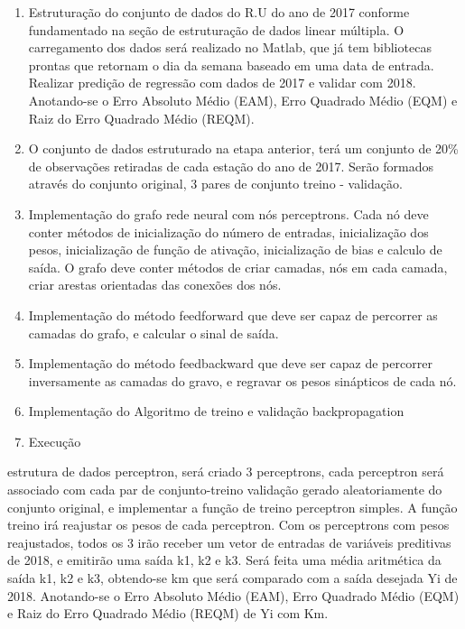 \documentclass[	12pt, Times, openright, twoside, a4paper, english, brazil]{abntex2}
\begin{document}
    \begin{enumerate}
    
    \item Estruturação do conjunto de dados do R.U do ano de 2017 conforme fundamentado na seção de estruturação de dados linear múltipla. O carregamento dos dados será realizado no Matlab, que já tem bibliotecas prontas que retornam o dia da semana baseado em uma data de entrada. Realizar predição de regressão com dados de 2017 e validar com 2018. Anotando-se o Erro Absoluto Médio (EAM), Erro Quadrado Médio (EQM) e Raiz do Erro Quadrado Médio (REQM).
    
    \item O conjunto de dados estruturado na etapa anterior, terá um conjunto de 20\% de observações retiradas de cada estação do ano de 2017. Serão formados através do conjunto original, 3 pares de conjunto treino - validação.
    
    \item Implementação do grafo rede neural com nós perceptrons. Cada nó deve conter métodos de inicialização do número de entradas, inicialização dos pesos, inicialização de função de ativação, inicialização de bias e calculo de saída. O grafo deve conter métodos de criar camadas, nós em cada camada, criar arestas orientadas das conexões dos nós.

    \item Implementação do método feedforward que deve ser capaz de percorrer as camadas do grafo, e calcular o sinal de saída.

    \item Implementação do método feedbackward que deve ser capaz de percorrer inversamente as camadas do gravo, e regravar os pesos sinápticos de cada nó.

    \item Implementação do Algoritmo de treino e validação backpropagation

    \item Execução 

    \end{enumerate}

     estrutura de dados perceptron, será criado 3 perceptrons, cada perceptron será associado com cada par de conjunto-treino validação gerado aleatoriamente do conjunto original, e implementar a função de treino perceptron simples. A função treino irá reajustar os pesos de cada perceptron. Com os perceptrons com pesos reajustados, todos os 3 irão receber um vetor de entradas de variáveis preditivas de 2018, e emitirão uma saída k1, k2 e k3. Será feita uma média aritmética da saída k1, k2 e k3, obtendo-se km que será comparado com a saída desejada Yi de 2018. Anotando-se o Erro Absoluto Médio (EAM), Erro Quadrado Médio (EQM) e Raiz do Erro Quadrado Médio (REQM) de Yi com Km.
\end{document}
